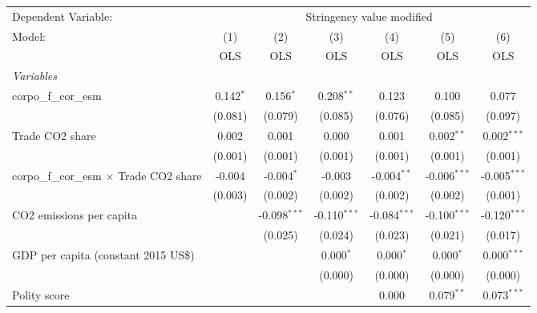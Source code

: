 
\begingroup
\centering
\begin{tabular}{lcccccc}
   \toprule
   Dependent Variable: & \multicolumn{6}{c}{Stringency value modified}\\
   Model:                                          & (1)         & (2)            & (3)            & (4)            & (5)            & (6)\\  
                                                   &  OLS        & OLS            & OLS            & OLS            & OLS            & OLS\\  
   \midrule
   \emph{Variables}\\
   corpo\_f\_cor\_esm                              & 0.142$^{*}$ & 0.156$^{*}$    & 0.208$^{**}$   & 0.123          & 0.100          & 0.077\\   
                                                   & (0.081)     & (0.079)        & (0.085)        & (0.076)        & (0.085)        & (0.097)\\   
   Trade CO2 share                                 & 0.002       & 0.001          & 0.000          & 0.001          & 0.002$^{**}$   & 0.002$^{***}$\\   
                                                   & (0.001)     & (0.001)        & (0.001)        & (0.001)        & (0.001)        & (0.001)\\   
   corpo\_f\_cor\_esm $\times$ Trade CO2 share     & -0.004      & -0.004$^{*}$   & -0.003         & -0.004$^{**}$  & -0.006$^{***}$ & -0.005$^{***}$\\   
                                                   & (0.003)     & (0.002)        & (0.002)        & (0.002)        & (0.002)        & (0.001)\\   
   CO2 emissions per capita                        &             & -0.098$^{***}$ & -0.110$^{***}$ & -0.084$^{***}$ & -0.100$^{***}$ & -0.120$^{***}$\\   
                                                   &             & (0.025)        & (0.024)        & (0.023)        & (0.021)        & (0.017)\\   
   GDP per capita (constant 2015 US\$)             &             &                & 0.000$^{*}$    & 0.000$^{*}$    & 0.000$^{*}$    & 0.000$^{***}$\\   
                                                   &             &                & (0.000)        & (0.000)        & (0.000)        & (0.000)\\   
   Polity score                                    &             &                &                & 0.000          & 0.079$^{**}$   & 0.073$^{***}$\\   

\end{tabular}
